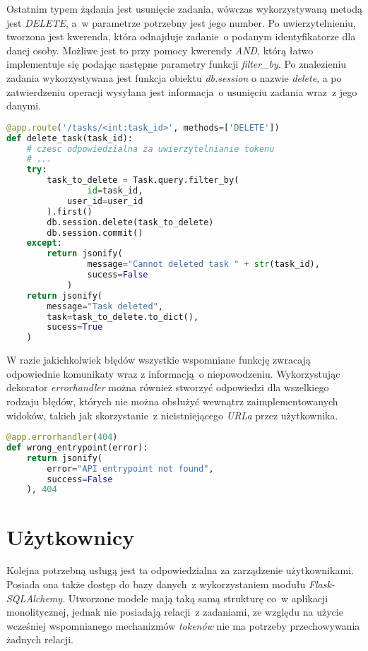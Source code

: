 Ostatnim typem żądania jest usunięcie zadania, wówczas wykorzystywaną metodą jest \textit{DELETE}, a~w parametrze potrzebny jest jego number. Po uwierzytelnieniu, tworzona jest kwerenda, która odnajduje zadanie~o podanym identyfikatorze dla danej osoby. Możliwe jest to przy pomocy kwerendy \textit{AND}, którą łatwo implementuje się podając następne parametry funkcji \textit{filter\_by}. Po znalezieniu zadania wykorzystywana jest funkcja obiektu \textit{db.session} o nazwie \textit{delete}, a po zatwierdzeniu operacji wysyłana jest informacja~o usunięciu zadania wraz~z jego danymi.
\newpage
\begin{lstlisting}[language=Python, caption={Kod widoku odpowiedzialnego za usuwanie zadań.}]
@app.route('/tasks/<int:task_id>', methods=['DELETE'])
def delete_task(task_id):
	# czesc odpowiedzialna za uwierzytelnianie tokenu
	# ... 
    try:
        task_to_delete = Task.query.filter_by(
        		id=task_id,
         	user_id=user_id
        ).first()
        db.session.delete(task_to_delete)
        db.session.commit()
    except:
        return jsonify(
        		message="Cannot deleted task " + str(task_id),
        		sucess=False
        	)
    return jsonify(
    	message="Task deleted",
    	task=task_to_delete.to_dict(),
    	sucess=True
    )
 \end{lstlisting}
W razie jakichkolwiek błędów wszystkie wspomniane funkcję zwracają odpowiednie komunikaty wraz z informacją~o niepowodzeniu. Wykorzystując dekorator \textit{errorhandler} można również stworzyć odpowiedzi dla wszelkiego rodzaju błędów, których nie można obsłużyć wewnątrz zaimplementowanych widoków, takich jak skorzystanie~z nieistniejącego \textit{URLa} przez użytkownika\cite{flask}.

\begin{lstlisting}[language=Python, caption={Wykorzystanie dekoratora \textit{errorhander} do nadpisania kodu błędu \textit{404}.}]
@app.errorhandler(404)
def wrong_entrypoint(error):
    return jsonify(
    	error="API entrypoint not found",
    	success=False
    ), 404 
\end{lstlisting}

\section{Użytkownicy}
Kolejna potrzebną usługą jest ta odpowiedzialna za zarządzenie użytkownikami. Posiada ona także dostęp do bazy danych~z wykorzystaniem modułu \textit{Flask-SQLAlchemy}. Utworzone modele mają taką samą strukturę co~w aplikacji monolitycznej, jednak nie posiadają relacji~z zadaniami, ze względu na użycie wcześniej wspomnianego mechanizmów \textit{tokenów} nie ma potrzeby przechowywania żadnych relacji.

